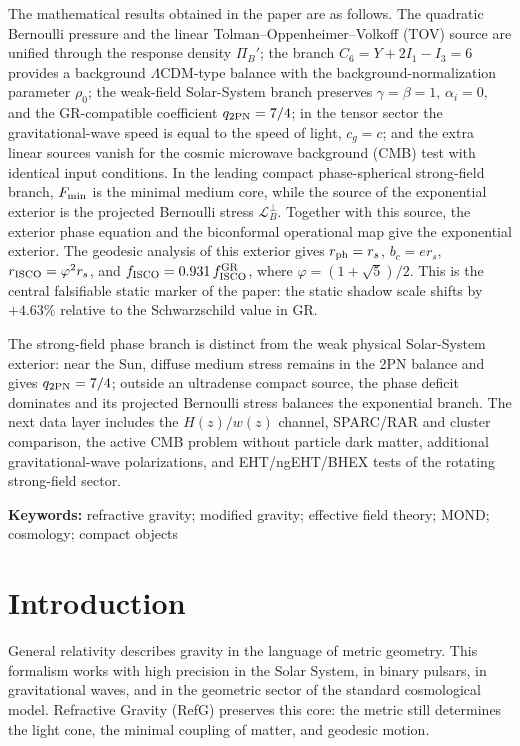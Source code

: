 \documentclass[12pt]{article}
\begin{document}
The mathematical results obtained in the paper are as follows. The quadratic Bernoulli pressure and the linear Tolman--Oppenheimer--Volkoff (TOV) source are unified through the response density $\Pi_B'$; the branch $C_6=Y+2I_1-I_3=6$ provides a background $\Lambda$CDM-type balance with the background-normalization parameter $\rho_0$; the weak-field Solar-System branch preserves $\gamma=\beta=1$, $\alpha_i=0$, and the GR-compatible coefficient $q_{\rm 2PN}=7/4$; in the tensor sector the gravitational-wave speed is equal to the speed of light, $c_g=c$; and the extra linear sources vanish for the cosmic microwave background (CMB) test with identical input conditions. In the leading compact phase-spherical strong-field branch, $F_{\rm min}$ is the minimal medium core, while the source of the exponential exterior is the projected Bernoulli stress $\mathcal L_B^\perp$. Together with this source, the exterior phase equation and the biconformal operational map give the exponential exterior. The geodesic analysis of this exterior gives $r_{\rm ph}=r_s$, $b_c=e r_s$, $r_{\rm ISCO}=\varphi^2 r_s$, and $f_{\rm ISCO}=0.931\,f_{\rm ISCO}^{\rm GR}$, where $\varphi=(1+\sqrt5)/2$. This is the central falsifiable static marker of the paper: the static shadow scale shifts by $+4.63\%$ relative to the Schwarzschild value in GR.

The strong-field phase branch is distinct from the weak physical Solar-System exterior: near the Sun, diffuse medium stress remains in the 2PN balance and gives $q_{\rm 2PN}=7/4$; outside an ultradense compact source, the phase deficit dominates and its projected Bernoulli stress balances the exponential branch. The next data layer includes the $H(z)/w(z)$ channel, SPARC/RAR and cluster comparison, the active CMB problem without particle dark matter, additional gravitational-wave polarizations, and EHT/ngEHT/BHEX tests of the rotating strong-field sector.

\noindent\textbf{Keywords:} refractive gravity; modified gravity; effective field theory; MOND; cosmology; compact objects

\section{Introduction}

General relativity describes gravity in the language of metric geometry. This formalism works with high precision in the Solar System, in binary pulsars, in gravitational waves, and in the geometric sector of the standard cosmological model. Refractive Gravity (RefG) preserves this core: the metric still determines the light cone, the minimal coupling of matter, and geodesic motion.
\end{document}
